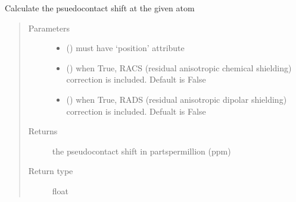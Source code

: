 \documentclass[a4paper,10pt,english,openany,oneside]{sphinxmanual}
\begin{document}
\begin{fulllineitems}
\begin{fulllineitems}
\begin{fulllineitems}
\label{\detokenize{reference/generated/paramagpy.metal.Metal.atom_pcs:paramagpy.metal.Metal.atom_pcs}}
\sphinxAtStartPar
Calculate the psuedo\sphinxhyphen{}contact shift at the given atom
\begin{quote}\begin{description}
\item[{Parameters}] \leavevmode\begin{itemize}
\item {} 
\sphinxAtStartPar
{} () \textendash{} must have ‘position’ attribute

\item {} 
\sphinxAtStartPar
{} (\sphinxstyleliteralemphasis{\sphinxupquote{ (}}\sphinxstyleliteralemphasis{\sphinxupquote{)}}) \textendash{} when True, RACS (residual anisotropic chemical shielding)
correction is included. Default is False

\item {} 
\sphinxAtStartPar
{} (\sphinxstyleliteralemphasis{\sphinxupquote{ (}}\sphinxstyleliteralemphasis{\sphinxupquote{)}}) \textendash{} when True, RADS (residual anisotropic dipolar shielding)
correction is included. Defualt is False

\end{itemize}

\item[{Returns}] \leavevmode
\sphinxAtStartPar
{} \textendash{} the pseudo\sphinxhyphen{}contact shift in parts\sphinxhyphen{}per\sphinxhyphen{}million (ppm)

\item[{Return type}] \leavevmode
\sphinxAtStartPar
float

\end{description}\end{quote}


\end{fulllineitems}
\end{fulllineitems}
\end{fulllineitems}
\end{document}
